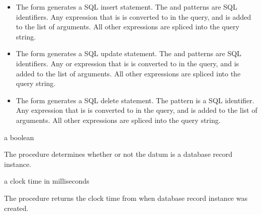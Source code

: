 \begin{itemize}

\item {}

  The  form generates a SQL insert statement. The
   and  patterns are SQL identifiers. Any
   expression that is  is converted
  to  in the query, and  is added to the list of
  arguments. All other expressions are spliced into the query string.

\item {}

  The  form generates a SQL update statement. The
   and  patterns are SQL identifiers. Any
   or  expression that is  is converted to  in the query, and 
  is added to the list of arguments. All other expressions are spliced
  into the query string.

\item {}

  The  form generates a SQL delete statement. The
   pattern is a SQL identifier. Any  expression
  that is  is converted to  in
  the query, and  is added to the list of arguments. All
  other expressions are spliced into the query string.

\end{itemize}

\begin{procedure}
\end{procedure}
\returns{} a boolean

The  procedure determines whether or not the datum
 is a database record instance.

\begin{procedure}
\end{procedure}
\returns{} a clock time in milliseconds

The  procedure returns the clock time from
 when database record instance  was created.

